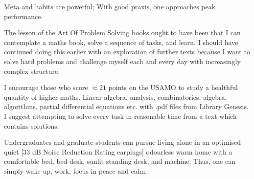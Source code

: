 Meta and habits are powerful; With good praxis, one approaches peak performance.

The lesson of the Art Of Problem Solving books ought to have been that I can contemplate a maths book, solve a sequence of tasks, and learn. I should have continued doing this earlier with an exploration of further texts because I want to solve hard problems and challenge myself each and every day with increasingly complex structure.

I encourage those who score $\approx 21$ points on the USAMO to study a healthful quantity of higher maths. Linear algebra, analysis, combinatorics, algebra, algorithms, partial differential equations etc. with .pdf files from Library Genesis. I suggest attempting to solve every task in reasonable time from a text which contains solutions.

Undergraduates and graduate students can pursue living alone in an optimised quiet [$33$ dB Noise Reduction Rating earplugs] odourless warm home with a comfortable bed, bed desk, sunlit standing desk, and machine. Thus, one can simply wake up, work, focus in peace and calm.